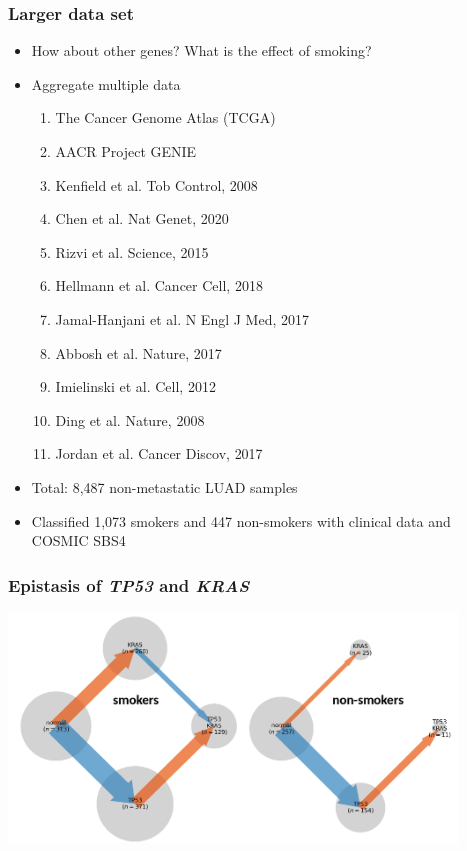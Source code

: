 \documentclass{beamer}
\begin{document}
\begin{frame}
  \frametitle{Larger data set}
  \begin{itemize}
  \item How about other genes? What is the effect of smoking? \pause
  \item Aggregate multiple data

    \begin{enumerate}
    \item The Cancer Genome Atlas (TCGA)
    \item AACR Project GENIE
    \item Kenfield et al. Tob Control, 2008
    \item Chen et al. Nat Genet, 2020
    \item Rizvi et al. Science, 2015
    \item Hellmann et al. Cancer Cell, 2018
    \item Jamal-Hanjani et al. N Engl J Med, 2017
    \item Abbosh et al. Nature, 2017
    \item Imielinski et al. Cell, 2012
    \item Ding et al. Nature, 2008
    \item Jordan et al. Cancer Discov, 2017
    \end{enumerate}\pause
  \item Total: 8,487 non-metastatic LUAD samples \pause
  \item Classified 1,073 smokers and 447 non-smokers with clinical
    data and COSMIC SBS4
  \end{itemize}

\end{frame}


\begin{frame}
  \frametitle{Epistasis of \textit{TP53} and \textit{KRAS}}
    \includegraphics[height=2.4in]{tp53_kras}
\end{frame}
\end{document}
